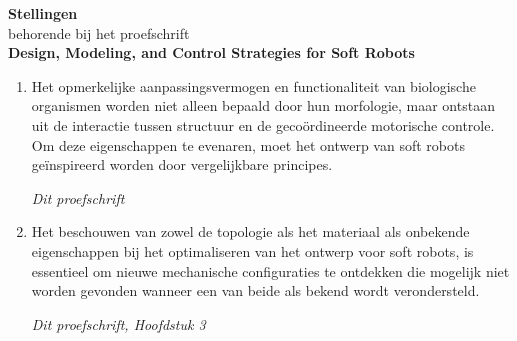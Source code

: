 \documentclass[a5paper]{article}
\renewcommand{\normalsize}{\fontsize{9}{9}\selectfont}
\newcommand{\largesize}{\fontsize{10}{9}\selectfont}
\begin{document}
\clearpage

\begin{center}
\largesize \textbf{Stellingen} \\[0.45em]
\normalsize behorende bij het proefschrift \\[0.45em]
{\textbf{\largesize Design, Modeling, and Control Strategies for Soft Robots}}
\end{center}

\begin{enumerate}
\setlength\itemsep{0.23em}
\item Het opmerkelijke aanpassingsvermogen en functionaliteit van biologische organismen worden niet alleen bepaald door hun morfologie, maar ontstaan uit de interactie tussen structuur en de gecoördineerde motorische controle. Om deze eigenschappen te evenaren, moet het ontwerp van soft robots geïnspireerd worden door vergelijkbare principes.
\begin{flushright}
  \vspace{-5mm}
  \textit{Dit proefschrift}
  \vspace{-1mm}
  \end{flushright}

\item Het beschouwen van zowel de topologie als het materiaal als onbekende eigenschappen bij het optimaliseren van het ontwerp voor soft robots, is essentieel om nieuwe mechanische configuraties te ontdekken die mogelijk niet worden gevonden wanneer een van beide als bekend wordt verondersteld.
\begin{flushright}
  \vspace{-5mm}
  \textit{Dit proefschrift, Hoofdstuk 3}
  \vspace{-1mm}
  \end{flushright}




\end{enumerate}
\end{document}
